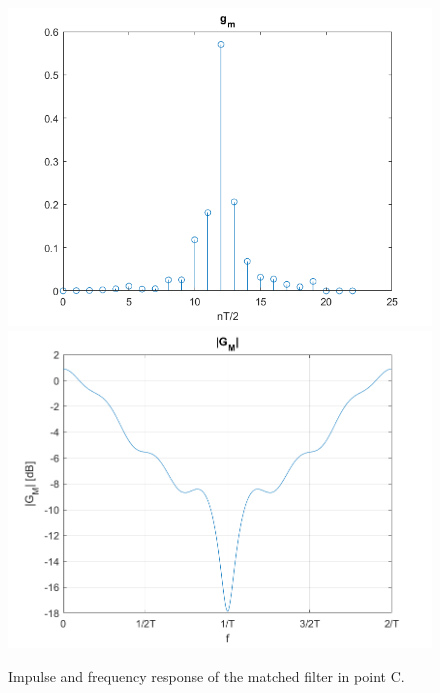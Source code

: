\documentclass[a4paper,11.5pt]{article}
\begin{document}
\begin{figure}[ht]
	\begin{center}   
		\includegraphics[width=\textwidth]{figs/C_gm.png} 
		\includegraphics[width=\textwidth]{figs/GM_CD.png}
		\caption{Impulse and frequency response of the matched filter in point C.}
		\label{fig:C_gm}
	\end{center}
\end{figure}
\end{document}
